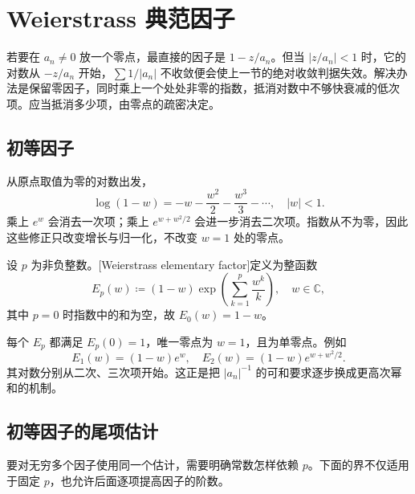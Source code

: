 \section{Weierstrass 典范因子}
\label{b3:sec:2002}

若要在 \(a_n\ne0\) 放一个零点，最直接的因子是 \(1-z/a_n\)。但当 \(|z/a_n|<1\) 时，它的对数从 \(-z/a_n\) 开始，\(\sum1/|a_n|\) 不收敛便会使上一节的绝对收敛判据失效。解决办法是保留零因子，同时乘上一个处处非零的指数，抵消对数中不够快衰减的低次项。应当抵消多少项，由零点的疏密决定。

\subsection{初等因子}
\label{b3:subsec:200201}

从原点取值为零的对数出发，
\[
 \log(1-w)=-w-\frac{w^2}{2}-\frac{w^3}{3}-\cdots,\quad |w|<1.
\]
乘上 \(e^w\) 会消去一次项；乘上 \(e^{w+w^2/2}\) 会进一步消去二次项。指数从不为零，因此这些修正只改变增长与归一化，不改变 \(w=1\) 处的零点。

\begin{definition}\label{b3:def:20-elementary-factor}
设 \(p\) 为非负整数。[Weierstrass elementary factor]定义为整函数
\[
 E_p(w)\coloneqq(1-w)
 \exp\left(\sum_{k=1}^{p}\frac{w^k}{k}\right),\quad w\in\mathbb C,
\]
其中 \(p=0\) 时指数中的和为空，故 \(E_0(w)=1-w\)。
\end{definition}
每个 \(E_p\) 都满足 \(E_p(0)=1\)，唯一零点为 \(w=1\)，且为单零点。例如
\[
 E_1(w)=(1-w)e^w,\quad
 E_2(w)=(1-w)e^{w+w^2/2}.
\]
其对数分别从二次、三次项开始。这正是把 \(|a_n|^{-1}\) 的可和要求逐步换成更高次幂和的机制。

\subsection{初等因子的尾项估计}
\label{b3:subsec:200202}

要对无穷多个因子使用同一个估计，需要明确常数怎样依赖 \(p\)。下面的界不仅适用于固定 \(p\)，也允许后面逐项提高因子的阶数。

